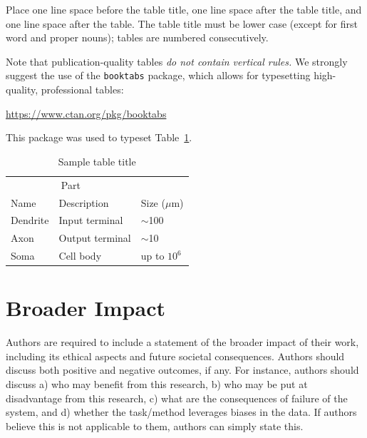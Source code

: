\documentclass{article}
\begin{document}
Place one line space before the table title, one line space after the
table title, and one line space after the table. The table title must
be lower case (except for first word and proper nouns); tables are
numbered consecutively.

Note that publication-quality tables \emph{do not contain vertical rules.} We
strongly suggest the use of the \verb+booktabs+ package, which allows for
typesetting high-quality, professional tables:
\begin{center}
  \url{https://www.ctan.org/pkg/booktabs}
\end{center}
This package was used to typeset Table~\ref{sample-table}.

\begin{table}
  \caption{Sample table title}
  \label{sample-table}
  \centering
  \begin{tabular}{lll}
    \toprule
    \multicolumn{2}{c}{Part}                   \\
    \cmidrule(r){1-2}
    Name     & Description     & Size ($\mu$m) \\
    \midrule
    Dendrite & Input terminal  & $\sim$100     \\
    Axon     & Output terminal & $\sim$10      \\
    Soma     & Cell body       & up to $10^6$  \\
    \bottomrule
  \end{tabular}
\end{table}
\section*{Broader Impact}

Authors are required to include a statement of the broader impact of their work, including its ethical aspects and future societal consequences. 
Authors should discuss both positive and negative outcomes, if any. For instance, authors should discuss a) 
who may benefit from this research, b) who may be put at disadvantage from this research, c) what are the consequences of failure of the system, and d) whether the task/method leverages
biases in the data. If authors believe this is not applicable to them, authors can simply state this.



 
\end{document}
